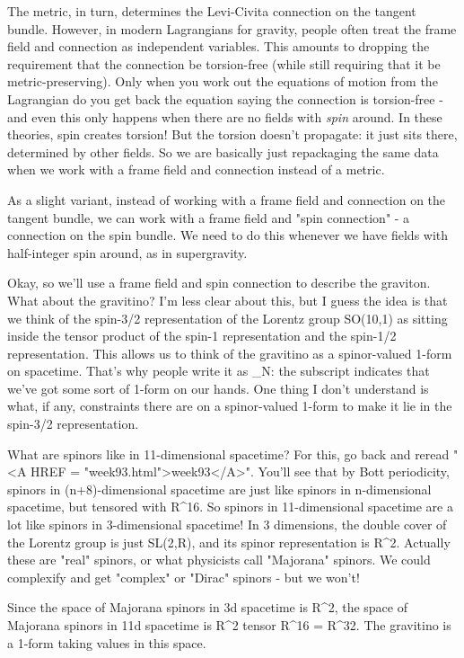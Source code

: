 The metric, in turn, determines the Levi-Civita connection on the 
tangent bundle.  However, in modern Lagrangians for gravity, people 
often treat the frame field and connection as independent variables.   
This amounts to dropping the requirement that the connection be 
torsion-free (while still requiring that it be metric-preserving).  Only 
when you work out the equations of motion from the Lagrangian do you get 
back the equation saying the connection is torsion-free - and even this 
only happens when there are no fields with \emph{spin} around.   In these 
theories, spin creates torsion!  But the torsion doesn't propagate:  it 
just sits there, determined by other fields.  So we are basically just 
repackaging the same data when we work with a frame field and connection 
instead of a metric.   
 
As a slight variant, instead of working with a frame field and 
connection on the tangent bundle, we can work with a frame field and 
"spin connection" - a connection on the spin bundle.  We need to do this 
whenever we have fields with half-integer spin around, as in supergravity.    
 
Okay, so we'll use a frame field and spin connection to describe the
graviton.  What about the gravitino?  I'm less clear about this, but I
guess the idea is that we think of the spin-3/2 representation of the
Lorentz group SO(10,1) as sitting inside the tensor product of the
spin-1 representation and the spin-1/2 representation.  This allows us
to think of the gravitino as a spinor-valued 1-form on spacetime.
That's why people write it as \psi _{N}: 
the subscript indicates that we've
got some sort of 1-form on our hands.  One thing I don't understand is
what, if any, constraints there are on a spinor-valued 1-form to make
it lie in the spin-3/2 representation.
  
What are spinors like in 11-dimensional spacetime?  For this, go back
and reread "<A HREF = "week93.html">week93</A>".  You'll see
that by Bott periodicity, spinors in (n+8)-dimensional spacetime are
just like spinors in n-dimensional spacetime, but tensored with
R^{16}.  So spinors in 11-dimensional spacetime are a lot like
spinors in 3-dimensional spacetime!  In 3 dimensions, the double cover
of the Lorentz group is just SL(2,R), and its spinor representation is
R^{2}.  Actually these are "real" spinors, or what
physicists call "Majorana" spinors.  We could complexify and
get "complex" or "Dirac" spinors - but we won't!
 
Since the space of Majorana spinors in 3d spacetime is R^{2},
the space of Majorana spinors in 11d spacetime is R^{2} tensor
R^{16} = R^{32}.  The gravitino is a 1-form taking
values in this space.
 
